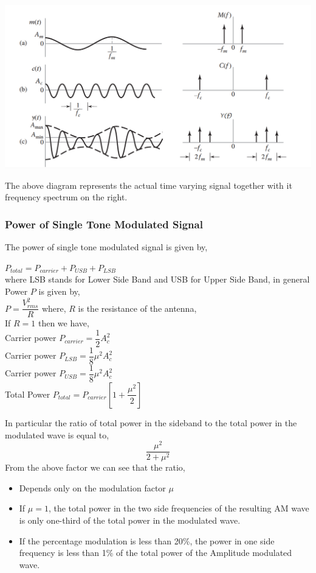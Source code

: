 \documentclass[12pt,a4paper]{article}%
\begin{document}
\begin{flushleft}
\begin{flushleft}
\begin{center}
				\includegraphics[width=0.99 \textwidth]{./images/Single tone.png}
			\end{center}
			The above diagram represents the actual time varying signal together with it frequency spectrum on the right.\\\smallskip
			\subsubsection{Power of Single Tone Modulated Signal}
			\begin{flushleft}
				The power of single tone modulated signal is given by,
				\begin{center}
					$P_{total}=P_{carrier}+P_{USB}+P_{LSB}$\\\bigskip
					where LSB stands for Lower Side Band and USB for Upper Side Band, in general Power $P$ is given by,\\\bigskip
					$P=\dfrac{V_{rms}^{2}}{R}$
					where, $R$ is the resistance of the antenna,\\\bigskip
					If $R=1$ then we have,\\\bigskip
					Carrier power $P_{carrier}=\dfrac{1}{2} A_c^2$\\\bigskip
					Carrier power $P_{LSB}=\dfrac{1}{8} \mu^2 A_c^2$\\\bigskip
					Carrier power $P_{USB}=\dfrac{1}{8} \mu^2 A_c^2$\\\bigskip
					Total Power $P_{total}=P_{carrier}[1+\dfrac{\mu^2}{2}]$
				\end{center}
			In particular the ratio of total power in the sideband to the total power in the modulated wave is equal to,\\\bigskip
			\begin{equation}
				\dfrac{\mu^2}{2+\mu^2}
			\end{equation}
			From the above factor we can see that the ratio,
			\begin{itemize}
				\item{Depends only on the modulation factor $\mu$}
				\item{If $\mu = 1$, the total power in the two side frequencies of the resulting AM wave is only one-third of the total power in the modulated wave.}
				\item{If the percentage modulation is less than 20\%, the power in one side frequency is less than 1\% of the total power of the Amplitude modulated wave. }
			\end{itemize}
			\end{flushleft}

\end{flushleft}
\end{flushleft}
\end{document}
